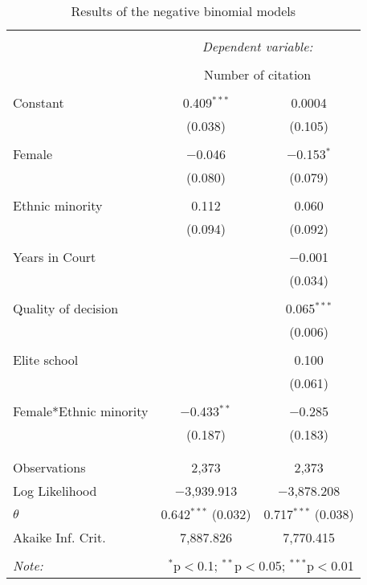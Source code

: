 
\begin{table}[!htbp] \centering 
  \caption{Results of the negative binomial models} 
  \label{} 
\begin{tabular}{@{\extracolsep{5pt}}lcc} 
\\[-1.8ex]\hline 
\hline \\[-1.8ex] 
 & \multicolumn{2}{c}{\textit{Dependent variable:}} \\ 
\cline{2-3} 
\\[-1.8ex] & \multicolumn{2}{c}{Number of citation} \\ 
\hline \\[-1.8ex] 
 Constant & 0.409$^{***}$ & 0.0004 \\ 
  & (0.038) & (0.105) \\ 
  & & \\ 
 Female & $-$0.046 & $-$0.153$^{*}$ \\ 
  & (0.080) & (0.079) \\ 
  & & \\ 
 Ethnic minority & 0.112 & 0.060 \\ 
  & (0.094) & (0.092) \\ 
  & & \\ 
 Years in Court &  & $-$0.001 \\ 
  &  & (0.034) \\ 
  & & \\ 
 Quality of decision &  & 0.065$^{***}$ \\ 
  &  & (0.006) \\ 
  & & \\ 
 Elite school &  & 0.100 \\ 
  &  & (0.061) \\ 
  & & \\ 
 Female*Ethnic minority & $-$0.433$^{**}$ & $-$0.285 \\ 
  & (0.187) & (0.183) \\ 
  & & \\ 
\hline \\[-1.8ex] 
Observations & 2,373 & 2,373 \\ 
Log Likelihood & $-$3,939.913 & $-$3,878.208 \\ 
$\theta$ & 0.642$^{***}$  (0.032) & 0.717$^{***}$  (0.038) \\ 
Akaike Inf. Crit. & 7,887.826 & 7,770.415 \\ 
\hline 
\hline \\[-1.8ex] 
\textit{Note:}  & \multicolumn{2}{r}{$^{*}$p$<$0.1; $^{**}$p$<$0.05; $^{***}$p$<$0.01} \\ 
\end{tabular} 
\end{table} 
